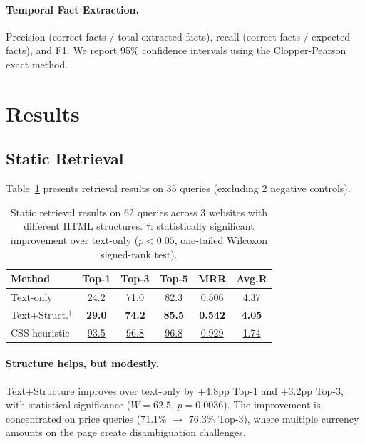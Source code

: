 \documentclass[11pt]{article}
\begin{document}
\paragraph{Temporal Fact Extraction.} Precision (correct facts / total extracted facts), recall (correct facts / expected facts), and F1. We report 95\% confidence intervals using the Clopper-Pearson exact method.

\section{Results}
\label{sec:results}

\subsection{Static Retrieval}

Table~\ref{tab:static} presents retrieval results on 35 queries (excluding 2 negative controls).

\begin{table}[t]
\centering
\caption{Static retrieval results on 62 queries across 3 websites with different HTML structures. $\dagger$: statistically significant improvement over text-only ($p < 0.05$, one-tailed Wilcoxon signed-rank test).}
\label{tab:static}
\begin{tabular}{lccccc}
\toprule
\textbf{Method} & \textbf{Top-1} & \textbf{Top-3} & \textbf{Top-5} & \textbf{MRR} & \textbf{Avg.R} \\
\midrule
Text-only & 24.2 & 71.0 & 82.3 & 0.506 & 4.37 \\
Text+Struct.$^\dagger$ & \textbf{29.0} & \textbf{74.2} & \textbf{85.5} & \textbf{0.542} & \textbf{4.05} \\
CSS heuristic & \underline{93.5} & \underline{96.8} & \underline{96.8} & \underline{0.929} & \underline{1.74} \\
\bottomrule
\end{tabular}
\end{table}

\paragraph{Structure helps, but modestly.} Text+Structure improves over text-only by +4.8pp Top-1 and +3.2pp Top-3, with statistical significance ($W = 62.5$, $p = 0.0036$). The improvement is concentrated on price queries (71.1\% $\rightarrow$ 76.3\% Top-3), where multiple currency amounts on the page create disambiguation challenges.
\end{document}
